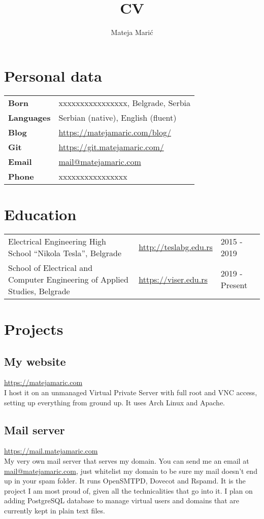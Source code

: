\documentclass{article}
\title{CV}
\author{Mateja Mari\'c}
\renewcommand{\maketitle}{
\begin{flushleft}
\huge\bfseries
\theauthor \hfill \thetitle
\normalsize\mdseries
\end{flushleft}
}
\begin{document}
\maketitle
\vspace{0.1em}

\section{Personal data}
\begin{tabular}{ @{} l l }
\large\textbf{Born}       & \normalsize xxxxxxxxxxxxxxxx, Belgrade, Serbia\\
\large\textbf{Languages}  & \normalsize Serbian (native), English (fluent)\\
\large\textbf{Blog}       & \normalsize \url{https://matejamaric.com/blog/}\\
\large\textbf{Git}        & \normalsize \url{https://git.matejamaric.com/}\\
\large\textbf{Email}      & \normalsize \url{mail@matejamaric.com}\\
\large\textbf{Phone}      & \normalsize xxxxxxxxxxxxxxxx
\end{tabular}

\section{Education}
\begin{tabular}{ @{} p{3in} l l }
Electrical Engineering High School ``Nikola Tesla'', Belgrade              & \url{http://teslabg.edu.rs}  & 2015 - 2019\\
School of Electrical and Computer Engineering of Applied Studies, Belgrade & \url{https://viser.edu.rs}   & 2019 - Present
\end{tabular}

\section{Projects}
\subsection{My website}
\hfill\url{https://matejamaric.com}\\
I host it on an unmanaged Virtual Private Server with full root and VNC access, setting up everything from ground up.
It uses Arch Linux and Apache.
\\
\subsection{Mail server}
\hfill\url{https://mail.matejamaric.com}\\
My very own mail server that serves my domain.
You can send me an email at \url{mail@matejamaric.com},
just whitelist my domain to be sure my mail doesn't end up in your spam folder.
It runs OpenSMTPD, Dovecot and Rspamd.
It is the project I am most proud of, given all the technicalities that go into it.
I plan on adding PostgreSQL database to manage virtual users and domains that are currently kept in plain text files.
\\
\end{document}
